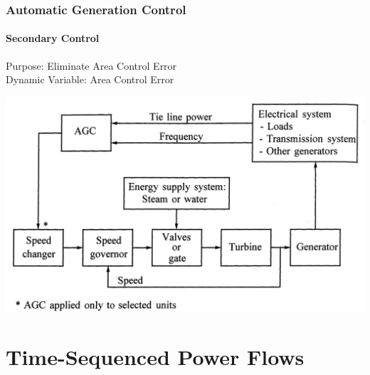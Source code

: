 \documentclass[14pt, unknownkeysallowed]{beamer}
\begin{document}
\begin{frame}
\frametitle{Automatic Generation Control}
\framesubtitle{Secondary Control}

Purpose: Eliminate Area Control Error\\
\vspace{.5em}
Dynamic Variable: Area Control Error
\begin{center}
\includegraphics[height=.55\textheight]{AGCblockdiagram}
{\tiny\cite{Kundur}}
\end{center}
\end{frame}


\section{Time-Sequenced Power Flows}
\end{document}

